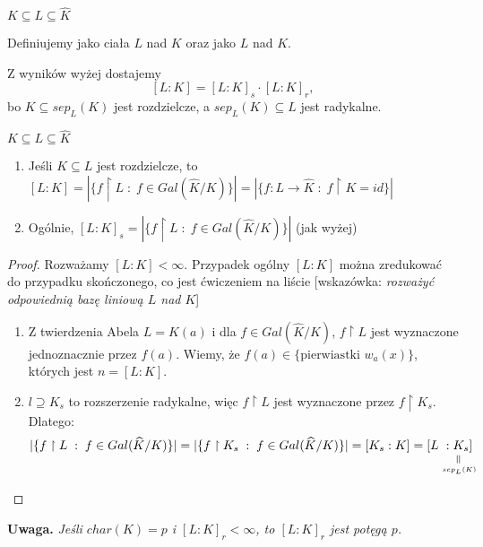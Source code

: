 \begin{bbox}
$K\subseteq L\subseteq\hat{K}$

Definiujemy  jako  ciała $L$ nad $K$ oraz  jako  $L$ nad $K$. 
\end{bbox}

Z wyników wyżej dostajemy
$$[L:K]=[L:K]_s\cdot[L:K]_r,$$
bo $K\subseteq sep_L(K)$ jest rozdzielcze, a $sep_L(K)\subseteq L$ jest radykalne.
\begin{remark}
$K\subseteq L\subseteq\hat{K}$
\begin{enumerate}
    \item Jeśli $K\subseteq L$ jest rozdzielcze, to $[L:K]=|\{f\restriction L\;:\;f\in Gal(\hat{K}/K)\}|=|\{f:L\to\hat{K}\;:\;f\restriction K=id\}|$
    \item Ogólnie, $[L:K]_s=|\{f\restriction L\;:\;f\in Gal(\hat{K}/K)\}|$ (jak wyżej)
\end{enumerate}
\end{remark}
\begin{proof}
Rozważamy $[L:K]<\infty$. Przypadek ogólny $[L:K]$ można zredukować do przypadku skończonego, co jest ćwiczeniem na liście [wskazówka: \emph{rozważyć odpowiednią bazę liniową $L$ nad $K$}]
\begin{enumerate}[leftmargin=*]
    \item Z twierdzenia Abela $L=K(a)$ i dla $f\in Gal(\hat{K}/K)$, $f\restriction L$ jest wyznaczone jednoznacznie przez $f(a)$. Wiemy, że $f(a)\in\{\text{pierwiastki }w_a(x)\}$, których jest $n=[L:K]$.
    \item $l\supseteq K_s$ to rozszerzenie radykalne, więc $f\restriction L$ jest wyznaczone przez $f\restriction K_s$. Dlatego:
    $$|\{f\restriction L\;:\;f\in Gal(\hat{K}/K)\}|=|\{f\restriction K_s\;:\;f\in Gal(\hat{K}/K)\}|=[K_s:K]=[L\underset{\underset{\scriptscriptstyle sep_L(K)}{\rotatebox{90}{=}}}{:K_s]}$$
\end{enumerate}
\end{proof}

\textbf{\large\color{blue}Uwaga. }{\slshape Jeśli $char(K)=p$ i $[L:K]_r<\infty$, to $[L:K]_r$ jest potęgą $p$.}

